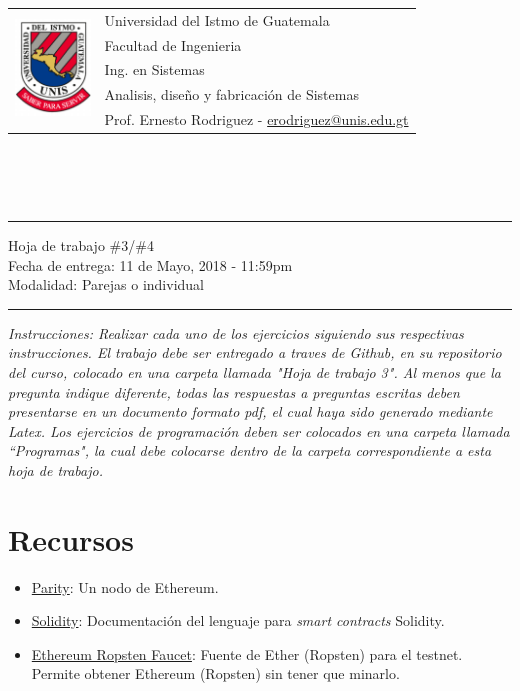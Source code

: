 \documentclass{article}
\newcommand{\horrule}[1]{\rule{\linewidth}{#1}}
\newcommand{\perlscript}[2]{
\begin{itemize}
\item[]
\end{itemize}
}
\begin{document}
\begin{tabular}{l l}
\multirow{5}{*}{\includegraphics[width=2cm]{../../Recursos/logo.png}} & Universidad del Istmo de Guatemala \\
 & Facultad de Ingenieria \\
 & Ing. en Sistemas \\
 & Analisis, dise\~no y fabricaci\'on de Sistemas \\
 & Prof. Ernesto Rodriguez - \href{mailto:erodriguez@unis.edu.gt}{erodriguez@unis.edu.gt} \\
\end{tabular}
\\\\\\

\begin{center}
        \horrule{0.5pt}
        \huge{Hoja de trabajo \#3/\#4} \\
        \large{Fecha de entrega: 11 de Mayo, 2018 - 11:59pm} \\
        Modalidad: Parejas o individual \\
        \horrule{1pt}
\end{center}

\emph{Instrucciones: Realizar cada uno de los ejercicios siguiendo sus respectivas
instrucciones. El trabajo debe ser entregado a traves de Github, en su repositorio del curso, colocado
en una carpeta llamada "Hoja de trabajo 3". Al menos que la pregunta indique diferente, todas las
respuestas a preguntas escritas deben presentarse en un documento formato pdf, el cual haya 
sido generado mediante Latex. Los ejercicios de programaci\'on deben ser colocados en una carpeta
llamada ``Programas", la cual debe colocarse dentro de la carpeta correspondiente a esta hoja de trabajo.}


\section*{Recursos}
\begin{itemize}
        \item{\href{https://www.parity.io/}{Parity}: Un nodo de Ethereum.}
        \item{\href{https://solidity.readthedocs.io/en/v0.4.23/}{Solidity}: Documentaci\'on
        del lenguaje para \emph{smart contracts} Solidity.}
        \item{\href{http://faucet.ropsten.be:3001/}{Ethereum Ropsten Faucet}: Fuente de
        Ether (Ropsten) para el testnet. Permite obtener Ethereum (Ropsten) sin tener que
        minarlo.}
\end{itemize}
\end{document}
